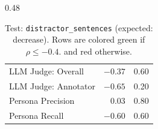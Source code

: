 \begin{table}[htbp]
\begin{subtable}[t]{0.48\textwidth}
\begin{tabular}{lrr}
\rowcolor{matchFalse} LLM Judge: Overall                    &  $-0.37$ &  0.60 \\
\rowcolor{matchTrue} LLM Judge: Annotator        &  $-0.65$ &  0.20 \\
\rowcolor{matchFalse} Persona Precision                     &   $0.03$ &  0.80 \\
\rowcolor{matchTrue} Persona Recall                        &  $-0.60$ &  0.60 \\
\bottomrule
\end{tabular}
\caption{LLM metrics}
\end{subtable}
\caption{Test: \texttt{distractor\_sentences} (expected: decrease). Rows are colored green if $\rho\leq-0.4$. and red otherwise.}
\label{tab:distractor_sentences}
\end{table}


